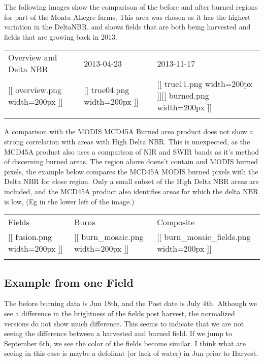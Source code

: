 \documentclass[]{article}
\begin{document}
The following images show the comparison of the before and after burned
regions for part of the Monta ALegre farms. This area was chosen as it
has the highest variation in the DeltaNBR, and shows fields that are
both being harvested and fields that are growing back in 2013.

\begin{longtable}[c]{@{}lll@{}}
\toprule\addlinespace
Overview and Delta NBR & 2013-04-23 & 2013-11-17
\\\addlinespace
\midrule\endhead
{[}{[} overview.png \textbar{} width=200px {]}{]} & {[}{[} true04.png
\textbar{} width=200px {]}{]} & {[}{[} true11.png \textbar{} width=200px
{]}{]}{[}{[} burned.png \textbar{} width=200px {]}{]}
\\\addlinespace
\bottomrule
\end{longtable}

A comparison with the MODIS MCD45A Burned area product does not show a
strong correlation with areas with High Delta NBR. This is unexpected,
as the MCD45A product also uses a comparison of NIR and SWIR bands as
it's method of discerning burned areas. The region above doens't contain
and MODIS burned pixels, the example below compares the MCD45A MODIS
burned pixels with the Delta NBR for close region. Only a small subset
of the High Delta NBR areas are included, and the MCD45A product also
identifies areas for which the delta NBR is low, (Eg in the lower left
of the image.)

\begin{longtable}[c]{@{}lll@{}}
\toprule\addlinespace
Fields & Burns & Composite
\\\addlinespace
\midrule\endhead
{[}{[} fusion.png \textbar{} width=200px {]}{]} & {[}{[}
burn\_mosaic.png \textbar{} width=200px {]}{]} & {[}{[}
burn\_mosaic\_fields.png \textbar{} width=200px {]}{]}
\\\addlinespace
\bottomrule
\end{longtable}

\subsection{Example from one Field}\label{example-from-one-field}

The before burning data is Jun 18th, and the Post date is July 4th.
Although we see a difference in the brightness of the fields post
harvest, the normalized versions do not show much difference. This seems
to indicate that we are not seeing the difference between a harvested
and burned field. If we jump to September 6th, we see the color of the
fields become similar. I think what are seeing in this case is maybe a
defoliant (or lack of water) in Jun prior to Harvest.
\end{document}
